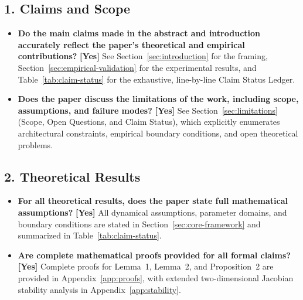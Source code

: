 \documentclass{article}
\theoremstyle{definition}
\begin{document}
\subsection*{1. Claims and Scope}
\begin{itemize}[nosep]
\item \textbf{Do the main claims made in the abstract and introduction accurately reflect the paper's theoretical and empirical contributions?} \textbf{[Yes]} See Section~\ref{sec:introduction} for the framing, Section~\ref{sec:empirical-validation} for the experimental results, and Table~\ref{tab:claim-status} for the exhaustive, line-by-line Claim Status Ledger.
\item \textbf{Does the paper discuss the limitations of the work, including scope, assumptions, and failure modes?} \textbf{[Yes]} See Section~\ref{sec:limitations} (Scope, Open Questions, and Claim Status), which explicitly enumerates architectural constraints, empirical boundary conditions, and open theoretical problems.
\end{itemize}

\subsection*{2. Theoretical Results}
\begin{itemize}[nosep]
\item \textbf{For all theoretical results, does the paper state full mathematical assumptions?} \textbf{[Yes]} All dynamical assumptions, parameter domains, and boundary conditions are stated in Section~\ref{sec:core-framework} and summarized in Table~\ref{tab:claim-status}.
\item \textbf{Are complete mathematical proofs provided for all formal claims?} \textbf{[Yes]} Complete proofs for Lemma~1, Lemma~2, and Proposition~2 are provided in Appendix~\ref{app:proofs}, with extended two-dimensional Jacobian stability analysis in Appendix~\ref{app:stability}.
\end{itemize}
\end{document}
